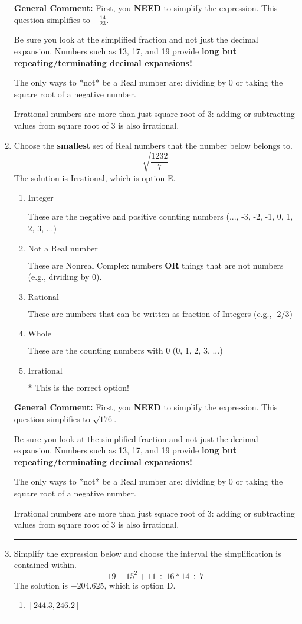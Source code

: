 \documentclass{extbook}[14pt]
\newcommand{\litem}[1]{\item #1

\rule{\textwidth}{0.4pt}}
\begin{document}
\begin{enumerate}
{\textbf{General Comment:} First, you \textbf{NEED} to simplify the expression. This question simplifies to $-\frac{14}{23}$. 
 
 Be sure you look at the simplified fraction and not just the decimal expansion. Numbers such as 13, 17, and 19 provide \textbf{long but repeating/terminating decimal expansions!} 
 
 The only ways to *not* be a Real number are: dividing by 0 or taking the square root of a negative number. 
 
 Irrational numbers are more than just square root of 3: adding or subtracting values from square root of 3 is also irrational.
}
\litem{
Choose the \textbf{smallest} set of Real numbers that the number below belongs to.
\[ \sqrt{\frac{1232}{7}} \]The solution is \( \text{Irrational} \), which is option E.\begin{enumerate}[label=\Alph*.]
\item \( \text{Integer} \)

These are the negative and positive counting numbers (..., -3, -2, -1, 0, 1, 2, 3, ...)
\item \( \text{Not a Real number} \)

These are Nonreal Complex numbers \textbf{OR} things that are not numbers (e.g., dividing by 0).
\item \( \text{Rational} \)

These are numbers that can be written as fraction of Integers (e.g., -2/3)
\item \( \text{Whole} \)

These are the counting numbers with 0 (0, 1, 2, 3, ...)
\item \( \text{Irrational} \)

* This is the correct option!
\end{enumerate}

\textbf{General Comment:} First, you \textbf{NEED} to simplify the expression. This question simplifies to $\sqrt{176}$. 
 
 Be sure you look at the simplified fraction and not just the decimal expansion. Numbers such as 13, 17, and 19 provide \textbf{long but repeating/terminating decimal expansions!} 
 
 The only ways to *not* be a Real number are: dividing by 0 or taking the square root of a negative number. 
 
 Irrational numbers are more than just square root of 3: adding or subtracting values from square root of 3 is also irrational.
}
\litem{
Simplify the expression below and choose the interval the simplification is contained within.
\[ 19 - 15^2 + 11 \div 16 * 14 \div 7 \]The solution is \( -204.625 \), which is option D.\begin{enumerate}[label=\Alph*.]
\item \( [244.3, 246.2] \)


\end{enumerate}}
\end{enumerate}
\end{document}
